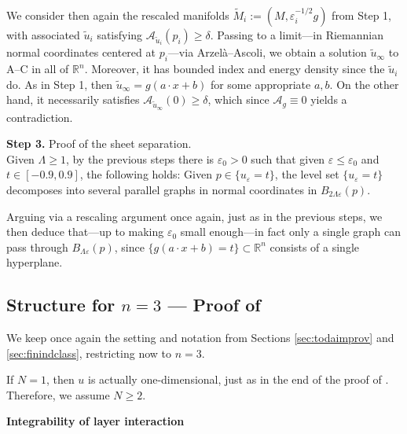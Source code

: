 \documentclass{article}
\newcommand{\R}{\mathbb{R}}
\newcommand{\ep}{\varepsilon}
\theoremstyle{definition}
\begin{document}
    We consider then again the rescaled manifolds $\widetilde M_i:=(M,\ep_i^{-1/2}g)$ from Step 1, with associated $\widetilde u_i$ satisfying $\mathcal A_{\widetilde u_i}(p_i)\geq \delta$. Passing to a limit---in Riemannian normal coordinates centered at $p_i$---via Arzel\`a--Ascoli, we obtain a solution $\widetilde u_\infty$ to A--C in all of $\R^n$. Moreover, it has bounded index and energy density since the $\widetilde u_i$ do. As in Step 1, then $\widetilde u_\infty=g(a\cdot x+b)$ for some appropriate $a,b$. On the other hand, it necessarily satisfies $\mathcal A_{\widetilde u_\infty}(0)\geq \delta$, which since $\mathcal A_g\equiv 0$ yields a contradiction.

    \noindent \textbf{Step 3.} Proof of the sheet separation.\\
    Given $\Lambda\geq 1$, by the previous steps there is $\ep_0>0$ such that given $\ep\leq \ep_0$ and $t\in[-0.9,0.9]$, the following holds: Given $p\in\{u_\ep=t\}$, the level set $\{u_\ep=t\}$ decomposes into several parallel graphs in normal coordinates in $B_{2\Lambda\ep}(p)$.
    
    Arguing via a rescaling argument once again, just as in the previous steps, we then deduce that---up to making $\ep_0$ small enough---in fact only a single graph can pass through $B_{\Lambda\ep}(p)$, since $\{g(a\cdot x+b)=t\}\subset \R^n$ consists of a single hyperplane.



\subsection{Structure for $n=3$ --- Proof of }\label{sec:R3indclass}
We keep once again the setting and notation from Sections \ref{sec:todaimprov} and \ref{sec:finindclass}, restricting now to $n=3$.

If $N=1$, then $u$ is actually one-dimensional, just as in the end of the proof of . Therefore, we assume $N\geq 2$.

{\bf Integrability of layer interaction}
\end{document}
